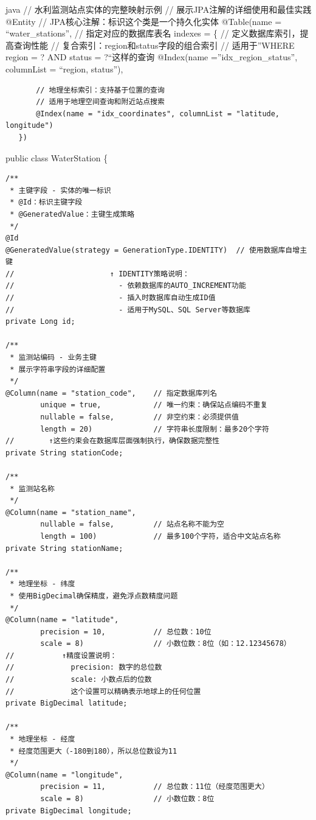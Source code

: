 java // 水利监测站点实体的完整映射示例 // 展示JPA注解的详细使用和最佳实践 @Entity // JPA核心注解：标识这个类是一个持久化实体 @Table(name = ``water\_stations'', // 指定对应的数据库表名 indexes = \{ // 定义数据库索引，提高查询性能 // 复合索引：region和status字段的组合索引 // 适用于''WHERE region = ? AND status = ?``这样的查询 @Index(name =''idx\_region\_status'', columnList = ``region, status''),

\begin{verbatim}
       // 地理坐标索引：支持基于位置的查询
       // 适用于地理空间查询和附近站点搜索
       @Index(name = "idx_coordinates", columnList = "latitude, longitude")
   })
\end{verbatim}

public class WaterStation \{

\begin{verbatim}
/**
 * 主键字段 - 实体的唯一标识
 * @Id：标识主键字段
 * @GeneratedValue：主键生成策略
 */
@Id
@GeneratedValue(strategy = GenerationType.IDENTITY)  // 使用数据库自增主键
//                      ↑ IDENTITY策略说明：
//                        - 依赖数据库的AUTO_INCREMENT功能
//                        - 插入时数据库自动生成ID值
//                        - 适用于MySQL、SQL Server等数据库
private Long id;

/**
 * 监测站编码 - 业务主键
 * 展示字符串字段的详细配置
 */
@Column(name = "station_code",    // 指定数据库列名
        unique = true,            // 唯一约束：确保站点编码不重复
        nullable = false,         // 非空约束：必须提供值
        length = 20)              // 字符串长度限制：最多20个字符
//        ↑这些约束会在数据库层面强制执行，确保数据完整性
private String stationCode;

/**
 * 监测站名称
 */
@Column(name = "station_name", 
        nullable = false,         // 站点名称不能为空
        length = 100)             // 最多100个字符，适合中文站点名称
private String stationName;

/**
 * 地理坐标 - 纬度
 * 使用BigDecimal确保精度，避免浮点数精度问题
 */
@Column(name = "latitude", 
        precision = 10,           // 总位数：10位
        scale = 8)                // 小数位数：8位（如：12.12345678）
//           ↑精度设置说明：
//             precision: 数字的总位数
//             scale: 小数点后的位数
//             这个设置可以精确表示地球上的任何位置
private BigDecimal latitude;

/**
 * 地理坐标 - 经度
 * 经度范围更大（-180到180），所以总位数设为11
 */
@Column(name = "longitude", 
        precision = 11,           // 总位数：11位（经度范围更大）
        scale = 8)                // 小数位数：8位
private BigDecimal longitude;


\end{verbatim}
